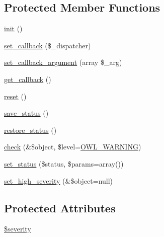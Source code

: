 \subsection*{Protected Member Functions}
\begin{DoxyCompactItemize}
\item 
\hyperlink{class__OWL_ae0ef3ded56e8a6b34b6461e5a721cd3e}{init} ()
\item 
\hyperlink{class__OWL_a28d9025eaf37b49d63cb334ed28c33f0}{set\_\-callback} (\$\_\-dispatcher)
\item 
\hyperlink{class__OWL_a1e26611ce858b237f5a98a91ea3c3a1b}{set\_\-callback\_\-argument} (array \$\_\-arg)
\item 
\hyperlink{class__OWL_abded13b1c97ea6e0cfe3c68cb6bcf7a5}{get\_\-callback} ()
\item 
\hyperlink{class__OWL_a2f2a042bcf31965194c03033df0edc9b}{reset} ()
\item 
\hyperlink{class__OWL_a9e49b9c76fbc021b244c6915ea536d71}{save\_\-status} ()
\item 
\hyperlink{class__OWL_a465eeaf40edd9f9c848841700c32ce55}{restore\_\-status} ()
\item 
\hyperlink{class__OWL_ae2e3c56e5f3c4ce4156c6b1bb1c50f63}{check} (\&\$object, \$level=\hyperlink{owl_8severitycodes_8php_ace886152e2e86cd2e91cb833fd495adb}{OWL\_\-WARNING})
\item 
\hyperlink{class__OWL_aea912d0ede9b3c2a69b79072d94d4787}{set\_\-status} (\$status, \$params=array())
\item 
\hyperlink{class__OWL_a576829692a3b66e3d518853bf43abae3}{set\_\-high\_\-severity} (\&\$object=null)
\end{DoxyCompactItemize}
\subsection*{Protected Attributes}
\begin{DoxyCompactItemize}
\item 
\hyperlink{class__OWL_ad26b40a9dbbacb33e299b17826f8327c}{\$severity}
\end{DoxyCompactItemize}
